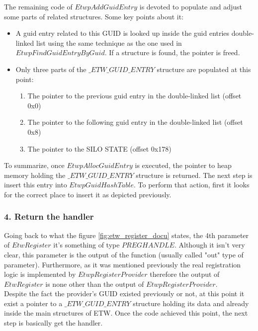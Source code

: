 The remaining code of $EtwpAddGuidEntry$ is devoted to populate and adjust some parts of related structures. Some key points about it: 
\begin{itemize}
  \setlength\itemsep{0.05em}
\item A guid entry related to this GUID is looked up inside the guid entries double-linked list using the same technique as the one used in $EtwpFindGuidEntryByGuid$. If a structure is found, the pointer is freed.
\item Only three parts of the $\_ETW\_GUID\_ENTRY$ structure are populated at this point:
  \begin{enumerate}
\setlength\itemsep{0.05em}
  \item The pointer to the previous guid entry in the double-linked list (offset 0x0)
  \item The pointer to the following guid entry in the double-linked list (offset 0x8)
  \item The pointer to the SILO STATE (offset 0x178)
  \end{enumerate}
\end{itemize}


To summarize, once $EtwpAllocGuidEntry$ is executed, the pointer to heap memory holding the $\_ETW\_GUID\_ENTRY$ structure is returned. The next step is insert this entry into $EtwpGuidHashTable$. To perform that action, first it looks for the correct place to insert it as depicted previously.





\subsubsection{\bfseries{4. Return the handler}}

Going back to what the figure \ref{fig:etw_register_docu} states, the 4th parameter of $EtwRegister$ it's something of type $PREGHANDLE$. Although it isn't very clear, this parameter is the output of the function (usually called "out" type of parameter). Furthermore, as it was mentioned previously the real registration logic is implemented by $EtwpRegisterProvider$ therefore the output of $EtwRegister$ is none other than the output of $EtwpRegisterProvider$.\\


Despite the fact the provider's GUID existed previously or not, at this point it exist a pointer to a $\_ETW\_GUID\_ENTRY$ structure holding its data and already inside the main structures of ETW. 
Once the code achieved this point, the next step is basically get the handler.

